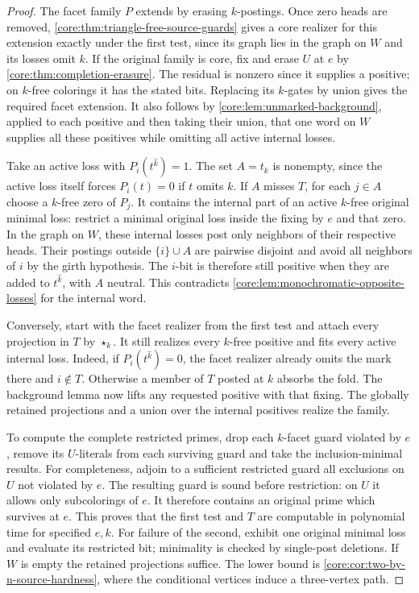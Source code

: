 \begin{proof}
The facet family $P$ extends by erasing $k$-postings. Once zero
heads are removed, \cref{core:thm:triangle-free-source-guards} gives
a core realizer for this extension exactly under the first test,
since its graph lies in the graph on $W$ and its losses omit $k$.
If the original family is core, fix and erase $U$ at $e$ by
\cref{core:thm:completion-erasure}. The residual is nonzero since it
supplies a positive; on $k$-free colorings it has the stated bits.
Replacing its $k$-gates by union gives the required facet extension.
It also follows by \cref{core:lem:unmarked-background}, applied to
each positive and then taking their union, that one word on $W$
supplies all these positives while omitting all active internal losses.

Take an active loss with $P_i(t^{\widehat k})=1$.
The set $A=t_k$ is nonempty, since the active loss itself forces
$P_i(t)=0$ if $t$ omits $k$. If $A$ misses $T$, for each $j\in A$
choose a $k$-free zero of $P_j$. It contains the internal part of
an active $k$-free original minimal loss: restrict a minimal
original loss inside the fixing by $e$ and that zero.
In the graph on $W$, these internal losses post only neighbors of
their respective heads. Their postings outside $\{i\}\cup A$ are
pairwise disjoint and avoid all neighbors of $i$ by the girth
hypothesis. The $i$-bit is therefore still positive when they are
added to $t^{\widehat k}$, with $A$ neutral. This contradicts
\cref{core:lem:monochromatic-opposite-losses} for the internal word.

Conversely, start with the facet realizer from the first test and
attach every projection in $T$ by $\star_k$. It still realizes
every $k$-free positive and fits every active internal loss.
Indeed, if $P_i(t^{\widehat k})=0$, the facet realizer already omits
the mark there and $i\notin T$. Otherwise a member of $T$ posted
at $k$ absorbs the fold. The background lemma now lifts any requested
positive with that fixing. The globally retained projections and a
union over the internal positives realize the family.

To compute the complete restricted primes, drop each $k$-facet
guard violated by $e$, remove its $U$-literals from each surviving
guard and take the inclusion-minimal results. For completeness,
adjoin to a sufficient restricted guard all exclusions on $U$ not
violated by $e$. The resulting guard is sound before restriction:
on $U$ it allows only subcolorings of $e$. It therefore contains an
original prime which survives at $e$. This proves that the first
test and $T$ are computable in polynomial time for specified $e,k$.
For failure of the second, exhibit one original minimal loss and
evaluate its restricted bit; minimality is checked by single-post
deletions. If $W$ is empty the retained projections suffice.
The lower bound is \cref{core:cor:two-by-n-source-hardness}, where
the conditional vertices induce a three-vertex path.
\end{proof}

